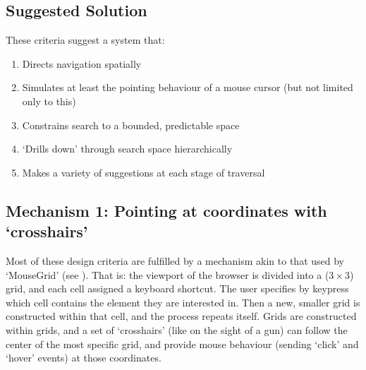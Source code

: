 \documentclass[11pt,openright,a4paper]{report}
\begin{document}

\subsection{Suggested Solution}
These criteria suggest a system that:

\newcommand{\designcriteria}{\begin{enumerate}
	\item Directs navigation spatially
	\item Simulates at least the pointing behaviour of a mouse cursor (but not limited only to this)
	\item Constrains search to a bounded, predictable space
	\item `Drills down' through search space hierarchically 
	\item Makes a variety of suggestions at each stage of traversal
\end{enumerate}}
\designcriteria

\subsection{Mechanism 1: Pointing at coordinates with `crosshairs'}
\label{sec:ourmousegrid}
Most of these design criteria are fulfilled by a mechanism akin to that used by `MouseGrid' (see ).
That is: the viewport of the browser is divided into a ($3\times3$) grid, and each cell assigned a keyboard shortcut. The user specifies by keypress which cell contains the element they are interested in. Then a new, smaller grid is constructed within that cell, and the process repeats itself.
Grids are constructed within grids, and a set of `crosshairs' (like on the sight of a gun) can follow the center of the most specific grid, and provide mouse behaviour (sending `click' and `hover' events) at those coordinates.
\end{document}
